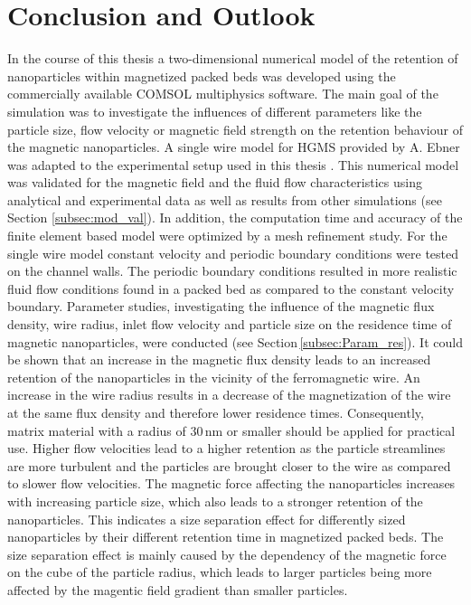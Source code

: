 
\chapter{Conclusion and Outlook}
\label{ch:Conclusion}


In the course of this thesis a two-dimensional numerical model of the retention of nanoparticles within magnetized packed beds was developed using the commercially available COMSOL multiphysics software. The main goal of the simulation was to investigate the influences of different parameters like the particle size, flow velocity or magnetic field strength on the retention behaviour of the magnetic nanoparticles. 
A single wire model for HGMS provided by A. Ebner was adapted to the experimental setup used in this thesis \cite{choomphon2017simulation}. This numerical model was validated for the magnetic field and the fluid flow characteristics using analytical and experimental data as well as results from other simulations (see Section \ref{subsec:mod_val}). In addition, the computation time and accuracy of the finite element based model were optimized by a mesh refinement study. For the single wire model constant velocity and periodic boundary conditions were tested on the channel walls. The periodic boundary conditions resulted in more realistic fluid flow conditions found in a packed bed as compared to the constant velocity boundary. Parameter studies, investigating the influence of the magnetic flux density, wire radius, inlet flow velocity and particle size on the residence time of magnetic nanoparticles, were conducted (see Section\,\ref{subsec:Param_res}). It could be shown that an increase in the magnetic flux density leads to an increased retention of the nanoparticles in the vicinity of the ferromagnetic wire. An increase in the wire radius results in a decrease of the magnetization of the wire at the same flux density and therefore lower residence times. Consequently, matrix material with a radius of 30\,nm or smaller should be applied for practical use. Higher flow velocities lead to a higher retention as the particle streamlines are more turbulent and the particles are brought closer to the wire as compared to slower flow velocities. The magnetic force affecting the nanoparticles increases with increasing particle size, which also leads to a stronger retention of the nanoparticles. This indicates a size separation effect for differently sized nanoparticles by their different retention time in magnetized packed beds. The size separation effect is mainly caused by the dependency of the magnetic force on the cube of the particle radius, which leads to larger particles being more affected by the magentic field gradient than smaller particles.

